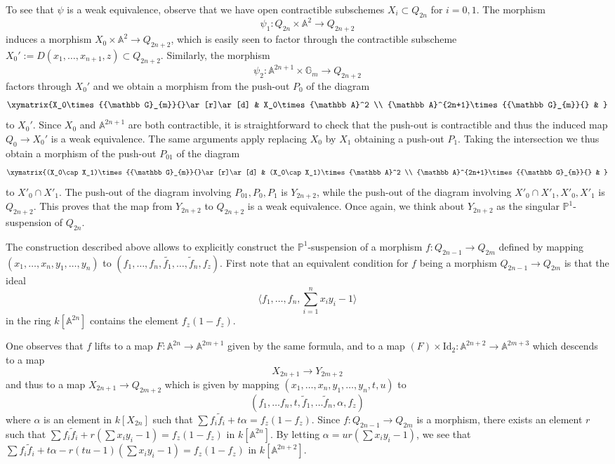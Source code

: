 \documentclass[11pt,leqno]{article}
\newcommand{\A}{{\mathbb A}}
\newcommand{\pone}{{\mathbb P}^1}
\renewcommand{\1}{{\rm 1\hspace*{-0.4ex}%
\rule{0.1ex}{1.52ex}\hspace*{0.2ex}}}
\newcommand{\gm}{{{\mathbb G}_{m}}}
\newcommand{\<}[1]{{\langle}#1 {\rangle}}
\theoremstyle{plain}
\theoremstyle{definition}
\theoremstyle{remark}
\numberwithin{equation}{section}
\begin{document}
To see that $\psi$ is a weak equivalence, observe that we have open contractible subschemes $X_i\subset Q_{2n}$ for $i=0,1$. The morphism
\[
\psi_1:Q_{2n}\times \A^2\to Q_{2n+2}
\]
induces a morphism $X_0\times \A^2\to Q_{2n+2}$, which is easily seen to factor through the contractible subscheme $X_0':=D(x_1,\ldots,x_{n+1},z)\subset Q_{2n+2}$. Similarly, the morphism 
\[
\psi_2:\A^{2n+1}\times \gm{}\to Q_{2n+2}
\]
factors through $X_0'$ and we obtain a morphism from the push-out $P_0$ of the diagram
\[
\xymatrix{X_0\times \gm{}\ar[r]\ar[d] & X_0\times \A^2 \\
\A^{2n+1}\times \gm{} &  }
\]
to $X_0'$. Since $X_0$ and $\A^{2n+1}$ are both contractible, it is straightforward to check that the push-out is contractible and thus the induced map $Q_0\to X_0'$ is a weak equivalence. The same arguments apply replacing $X_0$ by $X_1$ obtaining a push-out $P_1$. Taking the intersection we thus obtain a morphism of the push-out $P_{01}$ of the diagram 
\[
\xymatrix{(X_0\cap X_1)\times \gm{}\ar[r]\ar[d] & (X_0\cap X_1)\times \A^2 \\
\A^{2n+1}\times \gm{} & }
\]
to $X'_{0}\cap X'_1$. The push-out of the diagram involving $P_{01},P_0,P_1$ is $Y_{2n+2}$, while the push-out of the diagram involving $X'_0\cap X'_1,X'_0,X'_1$ is $Q_{2n+2}$. This proves that the map from $Y_{2n+2}$ to $Q_{2n+2}$ is a weak equivalence. Once again, we think about $Y_{2n+2}$ as the singular $\pone$-suspension of $Q_{2n}$.

The construction described above allows to explicitly construct the $\pone$-suspension of a morphism $f\colon Q_{2n-1}\to Q_{2m}$ defined by mapping $(x_1,\ldots,x_n,y_1,\ldots,y_n)$ to $(f_1, \ldots, f_n, \tilde{f_1},\ldots, \tilde{f}_n, f_z)$. First note that an equivalent condition for $f$ being a morphism $Q_{2n-1}\to Q_{2m}$ is that the ideal 
\[
\langle f_1, \ldots, f_n, \sum_{i=1}^n x_iy_i -1 \rangle
\] 
in the ring $k[\A^{2n}]$ contains the element $f_z(1-f_z)$.

One observes that $f$ lifts to a map $F:\A^{2n}\to \A^{2m+1}$ given by the same formula, and to a map $(F)\times \mathrm{Id}_2:\A^{2n+2}\to \A^{2m+3}$ which descends to a map
\[
X_{2n+1}\to Y_{2m+2}
\]
and thus to a map $X_{2n+1}\to Q_{2m+2}$ which is given by mapping $(x_1,\ldots,x_n,y_1,\ldots,y_n,t,u)$ to 
\[
(f_1,\ldots f_n,t, \tilde f_1 ,\ldots\tilde f_n,\alpha,f_z)
\]
where $\alpha$ is an element in $k[X_{2n}]$ such that $\sum f_i\tilde f_i + t\alpha = f_z(1-f_z)$. Since $f\colon Q_{2n-1} \to Q_{2m}$ is a morphism, there exists an element $r$ such that $\sum f_i \tilde f_i + r(\sum x_i y_i -1) = f_z(1-f_z)$ in $k[\A^{2n}]$. By letting $\alpha = ur(\sum x_i y_i -1)$, we see that 
$\sum f_i\tilde f_i + t\alpha - r(tu-1)(\sum x_i y_i -1) = f_z(1-f_z)$ in $k[\A^{2n+2}].$
\end{document}
